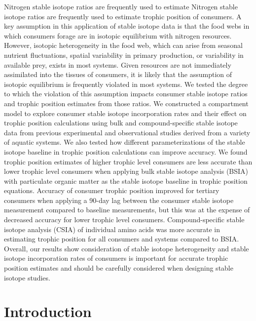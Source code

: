 \documentclass [11pt, proquest] {uwthesis}[2015/03/03]
\begin{document}
Nitrogen stable isotope ratios are frequently used to estimate Nitrogen
stable isotope ratios are frequently used to estimate trophic position
of consumers. A key assumption in this application of stable isotope
data is that the food webs in which consumers forage are in isotopic
equilibrium with nitrogen resources. However, isotopic heterogeneity in
the food web, which can arise from seasonal nutrient fluctuations,
spatial variability in primary production, or variability in available
prey, exists in most systems. Given resources are not immediately
assimilated into the tissues of consumers, it is likely that the
assumption of isotopic equilibrium is frequently violated in most
systems. We tested the degree to which the violation of this assumption
impacts consumer stable isotope ratios and trophic position estimates
from those ratios. We constructed a compartment model to explore
consumer stable isotope incorporation rates and their effect on trophic
position calculations using bulk and compound-specific stable isotope
data from previous experimental and observational studies derived from a
variety of aquatic systems. We also tested how different
parameterizations of the stable isotope baseline in trophic position
calculations can improve accuracy. We found trophic position estimates
of higher trophic level consumers are less accurate than lower trophic
level consumers when applying bulk stable isotope analysis (BSIA) with
particulate organic matter as the stable isotope baseline in trophic
position equations. Accuracy of consumer trophic position improved for
tertiary consumers when applying a 90-day lag between the consumer
stable isotope measurement compared to baseline measurements, but this
was at the expense of decreased accuracy for lower trophic level
consumers. Compound-specific stable isotope analysis (CSIA) of
individual amino acids was more accurate in estimating trophic position
for all consumers and systems compared to BSIA. Overall, our results
show consideration of stable isotope heterogeneity and stable isotope
incorporation rates of consumers is important for accurate trophic
position estimates and should be carefully considered when designing
stable isotope studies. \clearpage

\section{Introduction}\label{introduction-5}
\end{document}
